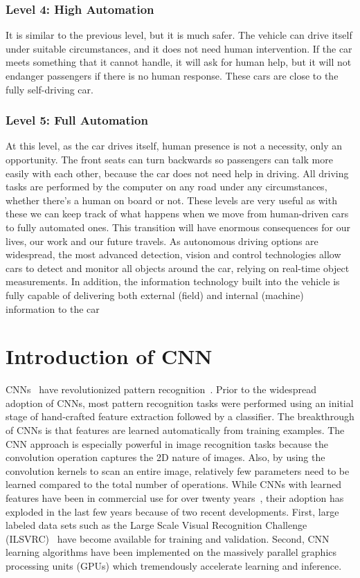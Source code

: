 \subsubsection{Level 4: High Automation} 
It is similar to the previous level, but it is much safer. The vehicle can drive itself under suitable circumstances, and it does not need human intervention. If the car meets something that it cannot handle, it will ask for human help, but it will not endanger passengers if there is no human response. These cars are close to the fully self-driving car. 

\subsubsection{Level 5: Full Automation} 
At this level, as the car drives itself, human presence is not a necessity, only an opportunity. The  front seats  can turn backwards  so  passengers  can  talk more  easily  with  each other,  because the  car  does not  need  help in  driving.  All driving tasks are performed by the computer on any road under any circumstances, whether there's a human on board or not. These levels are very useful as with these we can keep track of what happens when we move from human-driven cars to fully  automated ones. This  transition will  have enormous consequences for our lives, our work and our future travels. As  autonomous driving  options are  widespread, the  most advanced detection,  vision and control  technologies allow cars to detect and monitor all objects around the car, relying on real-time object measurements. In  addition,  the  information  technology  built  into  the vehicle is fully capable of delivering both external (field)  and internal (machine) information to the car


\section{Introduction of CNN}

 CNNs~\cite{lecun1989backpropagation} have revolutionized pattern recognition~\cite{krizhevsky2012imagenet}. Prior to the widespread adoption of CNNs, most pattern recognition tasks were performed using an initial stage of hand-crafted feature extraction followed by a classifier. The breakthrough of CNNs is that features are learned automatically from training examples. The CNN approach is especially powerful in image recognition tasks because the convolution operation captures the 2D nature of images. Also, by using the convolution kernels to scan an entire image, relatively few parameters need to be learned compared to the total number of operations. While CNNs with learned features have been in commercial use for over twenty years~\cite{jackel1995optical}, their adoption has exploded in the last few years because of two recent developments. First, large labeled data sets such as the Large Scale Visual Recognition Challenge (ILSVRC)~\cite{berg2010large} have become available for training and validation. Second, CNN learning algorithms have been implemented on the massively parallel graphics processing units (GPUs) which tremendously accelerate learning and inference.\\

